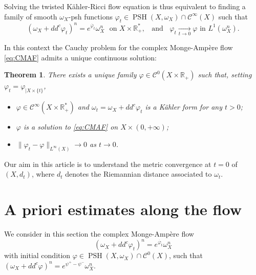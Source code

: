 \documentclass[a4paper,11pt,leqno,english]{smfart}
\theoremstyle{plain}
\newtheorem{thm}{Theorem}[section]
\theoremstyle{plain}
\numberwithin{equation}{section} %
\numberwithin{figure}{section} %
\theoremstyle{plain}
\theoremstyle{plain}
\theoremstyle{remark}
\theoremstyle{remark}
\theoremstyle{definition}
\theoremstyle{plain}
\theoremstyle{plain}
\theoremstyle{definition}
\newcommand{\R}{{\mathbb{R}}}
\newcommand{\f}{\varphi}
\newcommand{\p}{\psi}
\newcommand{\PSH}{\operatorname{PSH}}
\begin{document}
 \smallskip
 
 Solving the twisted K\"ahler-Ricci flow equation is thus equivalent to finding 
 a family of smooth $\omega_X$-psh functions $\f_t \in \PSH(X,\omega_X) \cap {\mathcal C}^{\infty}(X)$
 such that
 \begin{equation} \label{eq:CMAF}
 (\omega_X+dd^c \f_t)^n=e^{\dot{\f_t}} \omega_X^n \,\,
 \text{ on } X \times \R_+^*,
 \; \; \text{ and } \; \; 
 \f_t \underset{t\to 0}{\longrightarrow} \f
 \text{ in }  L^1(\omega_X^n).
 \end{equation}
 
 In this context the Cauchy problem for the complex Monge-Amp\`ere flow \eqref{eq:CMAF}
 admits a unique continuous solution:
 
 \begin{thm} \label{thm:GZ17}
 \cite{GZ17,DnL17,ST09}
 There exists a unique family $\f \in {\mathcal C}^0(X \times \R_+)$  such that,
 setting $\f_t=\f_{|X \times \{t\}}$,
 \begin{itemize}
 \item[$\bullet$] $\f\in {\mathcal C}^{\infty}(X \times \R_+^*)$ and 
 $\omega_t=\omega_X+dd^c \f_t$ is a K\"ahler form for any $t>0$;
 \item[$\bullet$] $\f$ is a solution to \eqref{eq:CMAF} on $X \times (0,+\infty)$;
 \item[$\bullet$] $\|\f_t-\f\|_{L^{\infty}(X)} \rightarrow 0$ as $t \rightarrow 0$.
 \end{itemize}
 \end{thm}
 
 Our aim in this article is to understand the metric convergence at $t=0$ of  $(X,d_{t})$,
 where $d_t$ denotes the Riemannian distance associated to $\omega_t$.
 
 
 
  
  


 
  

 
  

\section{A priori estimates along the flow} \label{sec:fkr}



We consider in this section the complex Monge-Amp\`ere flow
$$
(\omega_X+dd^c \f_t)^n=e^{\dot{\f_t}} \omega_X^n
$$
with initial condition $\f \in \PSH(X,\omega_X) \cap {\mathcal C}^0(X)$,
such that $(\omega_X+dd^c \f)^n=e^{\p^+-\p^-} \omega_X^n$.
\end{document}
